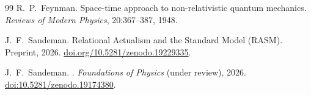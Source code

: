 \documentclass[11pt,a4paper]{article}
\theoremstyle{plain}
\theoremstyle{definition}
\theoremstyle{remark}
\begin{document}
\begin{thebibliography}{99}
R.~P.~Feynman.
\newblock Space-time approach to non-relativistic quantum mechanics.
\newblock \textit{Reviews of Modern Physics}, 20:367--387, 1948.

J.~F.~Sandeman.
\newblock Relational Actualism and the Standard Model ({RASM}).
\newblock Preprint, 2026.
\newblock \href{https://doi.org/10.5281/zenodo.19229335}{doi.org/10.5281/zenodo.19229335}.

J.~F.~Sandeman.
.
\newblock \textit{Foundations of Physics} (under review), 2026.
\newblock \href{https://doi.org/10.5281/zenodo.19174380}{doi:10.5281/zenodo.19174380}.

\end{thebibliography}
\end{document}
